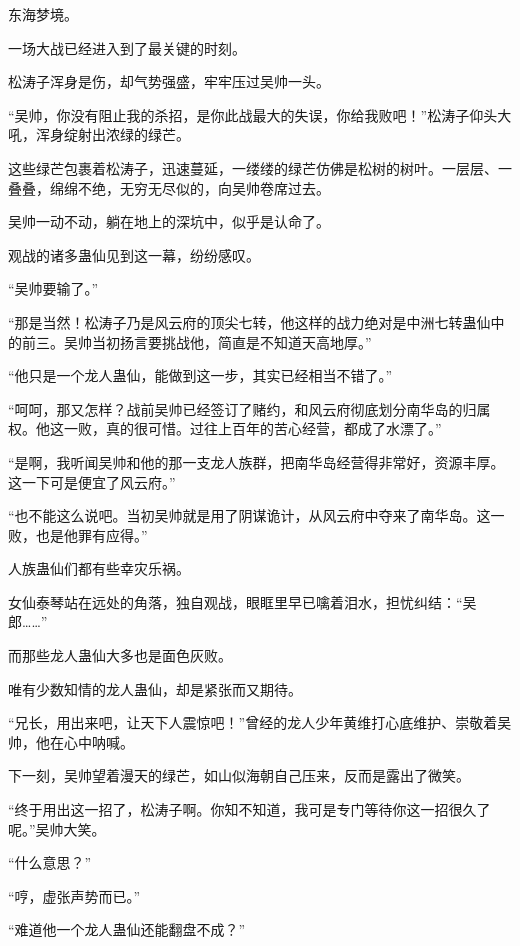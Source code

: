 
\begin{this_body}

东海梦境。

一场大战已经进入到了最关键的时刻。

松涛子浑身是伤，却气势强盛，牢牢压过吴帅一头。

“吴帅，你没有阻止我的杀招，是你此战最大的失误，你给我败吧！”松涛子仰头大吼，浑身绽射出浓绿的绿芒。

这些绿芒包裹着松涛子，迅速蔓延，一缕缕的绿芒仿佛是松树的树叶。一层层、一叠叠，绵绵不绝，无穷无尽似的，向吴帅卷席过去。

吴帅一动不动，躺在地上的深坑中，似乎是认命了。

观战的诸多蛊仙见到这一幕，纷纷感叹。

“吴帅要输了。”

“那是当然！松涛子乃是风云府的顶尖七转，他这样的战力绝对是中洲七转蛊仙中的前三。吴帅当初扬言要挑战他，简直是不知道天高地厚。”

“他只是一个龙人蛊仙，能做到这一步，其实已经相当不错了。”

“呵呵，那又怎样？战前吴帅已经签订了赌约，和风云府彻底划分南华岛的归属权。他这一败，真的很可惜。过往上百年的苦心经营，都成了水漂了。”

“是啊，我听闻吴帅和他的那一支龙人族群，把南华岛经营得非常好，资源丰厚。这一下可是便宜了风云府。”

“也不能这么说吧。当初吴帅就是用了阴谋诡计，从风云府中夺来了南华岛。这一败，也是他罪有应得。”

人族蛊仙们都有些幸灾乐祸。

女仙泰琴站在远处的角落，独自观战，眼眶里早已噙着泪水，担忧纠结：“吴郎……”

而那些龙人蛊仙大多也是面色灰败。

唯有少数知情的龙人蛊仙，却是紧张而又期待。

“兄长，用出来吧，让天下人震惊吧！”曾经的龙人少年黄维打心底维护、崇敬着吴帅，他在心中呐喊。

下一刻，吴帅望着漫天的绿芒，如山似海朝自己压来，反而是露出了微笑。

“终于用出这一招了，松涛子啊。你知不知道，我可是专门等待你这一招很久了呢。”吴帅大笑。

“什么意思？”

“哼，虚张声势而已。”

“难道他一个龙人蛊仙还能翻盘不成？”


\end{this_body}
